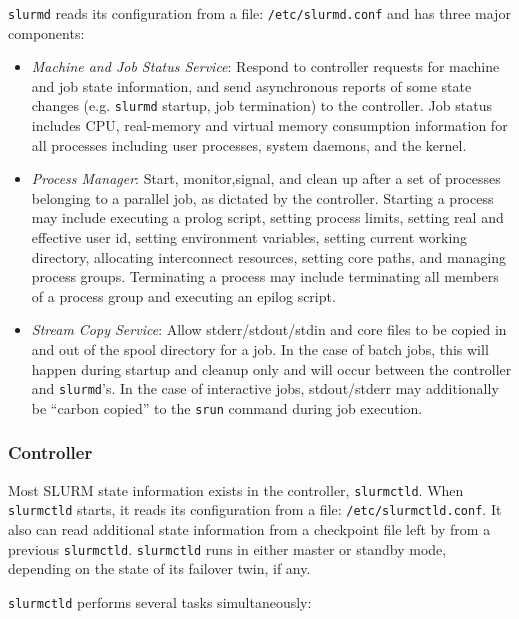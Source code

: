 {\tt slurmd} reads its configuration from a file: {\tt /etc/slurmd.conf}
and has three major components:

\begin{itemize}
\item {\em Machine and Job Status Service}:  Respond to controller 
requests for machine and job state information, and send asynchronous 
reports of some state changes (e.g. {\tt slurmd} startup, job 
termination) to the controller.
Job status includes CPU, real-memory and virtual memory consumption 
information for all processes including user processes, system daemons, 
and the kernel. 

\item{\em Process Manager}:  Start, monitor,signal, and clean up after
a set of processes belonging to a parallel job, as dictated by the
controller.  Starting a process may include executing a prolog script, 
setting process limits, setting real and effective user id, setting 
environment variables, setting current working directory, allocating 
interconnect resources, setting core paths, and managing process groups.  
Terminating a process may include terminating all members of a process 
group and executing an epilog script.

\item{\em Stream Copy Service}:  Allow stderr/stdout/stdin and core files
to be copied in and out of the spool directory for a job.  In the case
of batch jobs, this will happen during startup and cleanup only and will
occur between the controller and {\tt slurmd}'s.
In the case of interactive jobs, stdout/stderr may additionally be ``carbon 
copied'' to the {\tt srun} command during job execution.

\end{itemize}

\subsubsection{Controller}

Most SLURM state information exists in the controller, {\tt slurmctld}. 
When {\tt slurmctld} starts, it reads its configuration from a file:
{\tt /etc/slurmctld.conf}.  It also can read additional state information 
from a checkpoint file left by from a previous {\tt slurmctld}.
{\tt slurmctld} runs in either master or standby mode, depending
on the state of its failover twin, if any.  

{\tt slurmctld} performs several tasks simultaneously:

